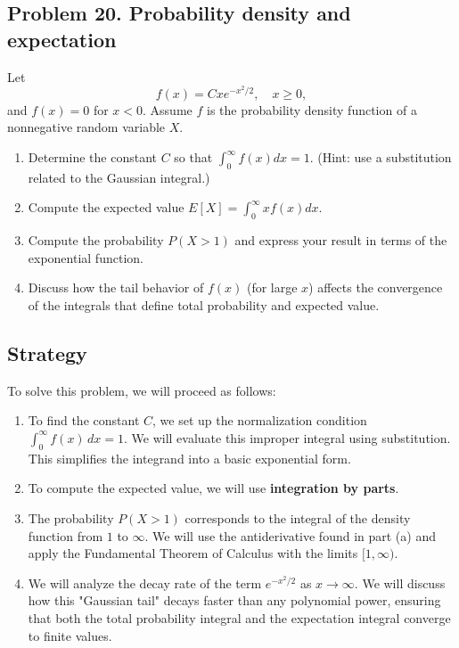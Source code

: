 \subsection{Problem 20. Probability density and expectation}
Let
\[f(x)=Cxe^{-x^{2}/2}, \quad x\ge0,\]
and $f(x)=0$ for $x<0$. Assume $f$ is the probability density function of a nonnegative random variable $X$.

\begin{enumerate}[label=(\alph*)]
    \item Determine the constant $C$ so that $\displaystyle\int_{0}^{\infty}f(x)dx=1$. (Hint: use a substitution related to the Gaussian integral.)
    \item Compute the expected value $E[X]=\displaystyle\int_{0}^{\infty}xf(x)dx$.
    \item Compute the probability $P(X>1)$ and express your result in terms of the exponential function.
    \item Discuss how the tail behavior of $f(x)$ (for large $x$) affects the convergence of the integrals that define total probability and expected value.
\end{enumerate}

\subsection*{Strategy}

To solve this problem, we will proceed as follows:

\begin{enumerate}[label = (\alph*)]
    \item To find the constant $C$, we set up the normalization condition $\int_{0}^{\infty} f(x) \, dx = 1$. We will evaluate this improper integral using substitution. This simplifies the integrand into a basic exponential form.
    
    \item To compute the expected value, we will use \textbf{integration by parts}.
    
    \item The probability $P(X > 1)$ corresponds to the integral of the density function from $1$ to $\infty$. We will use the antiderivative found in part (a) and apply the Fundamental Theorem of Calculus with the limits $[1, \infty)$.
    
    \item We will analyze the decay rate of the term $e^{-x^2/2}$ as $x \to \infty$. We will discuss how this "Gaussian tail" decays faster than any polynomial power, ensuring that both the total probability integral and the expectation integral converge to finite values.
\end{enumerate}

